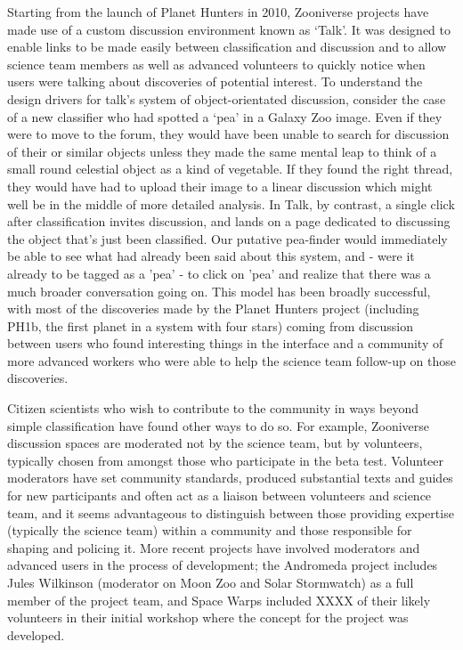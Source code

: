 \documentclass{sigchi}
\begin{document}
Starting from the launch of Planet Hunters in 2010, Zooniverse projects have made use of a custom discussion environment known as `Talk'. It was designed to enable links to be made easily between classification and discussion and to allow science team members as well as advanced volunteers to quickly notice when users were talking about discoveries of potential interest. To understand the design drivers for talk's system of object-orientated discussion, consider the case of a new classifier who had spotted a `pea' in a Galaxy Zoo image. Even if they were to move to the forum, they would have been unable to search for discussion of their or similar objects unless they made the same mental leap to think of a small round celestial object as a kind of vegetable. If they found the right thread, they would have had to upload their image to a linear discussion which might well be in the middle of more detailed analysis. In Talk, by contrast, a single click after classification invites discussion, and lands on a page dedicated to discussing the object that's just been classified. Our putative pea-finder would immediately be able to see what had already been said about this system, and - were it already to be tagged as a 'pea' - to click on 'pea' and realize that there was a much broader conversation going on. This model has been broadly successful, with most of the discoveries made by the Planet Hunters project (including PH1b, the first planet in a system with four stars) coming from discussion between users who found interesting things in the interface and a community of more advanced workers who were able to help the science team follow-up on those discoveries. 

Citizen scientists who wish to contribute to the community in ways beyond simple classification have found other ways to do so. For example, Zooniverse discussion spaces are moderated not by the science team, but by volunteers, typically chosen from amongst those who participate in the beta test. Volunteer moderators have set community standards, produced substantial texts and guides for new participants and often act as a liaison between volunteers and science team, and it seems advantageous to distinguish between those providing expertise (typically the science team) within a community and those responsible for shaping and policing it. More recent projects have involved moderators and advanced users in the process of development; the Andromeda project includes Jules Wilkinson (moderator on Moon Zoo and Solar Stormwatch) as a full member of the project team, and Space Warps included XXXX of their likely volunteers in their initial workshop where the concept for the project was developed. 
\end{document}
